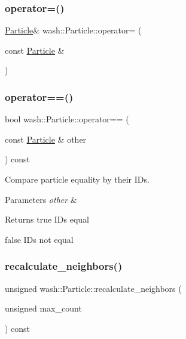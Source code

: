 \subsubsection{\texorpdfstring{operator=()}{operator=()}}
{\footnotesize\ttfamily \mbox{\hyperlink{classwash_1_1Particle}{Particle}}\& wash\+::\+Particle\+::operator= (\begin{DoxyParamCaption}\item[{const \mbox{\hyperlink{classwash_1_1Particle}{Particle}} \&}]{ }\end{DoxyParamCaption})\hspace{0.3cm}{\ttfamily [delete]}}

\mbox{\label{classwash_1_1Particle_a32369e6edba4277ebc71917a37c2503d}} 
\subsubsection{\texorpdfstring{operator==()}{operator==()}}
{\footnotesize\ttfamily bool wash\+::\+Particle\+::operator== (\begin{DoxyParamCaption}\item[{const \mbox{\hyperlink{classwash_1_1Particle}{Particle}} \&}]{other }\end{DoxyParamCaption}) const}



Compare particle equality by their I\+Ds. 


\begin{DoxyParams}{Parameters}
{\em other} & \\
\hline
\end{DoxyParams}
\begin{DoxyReturn}{Returns}
true ID\textquotesingle{}s equal 

false ID\textquotesingle{}s not equal 
\end{DoxyReturn}
\mbox{\label{classwash_1_1Particle_a570fc3286ab83d081950a5fb3d548d92}} 
\subsubsection{\texorpdfstring{recalculate\+\_\+neighbors()}{recalculate\_neighbors()}}
{\footnotesize\ttfamily unsigned wash\+::\+Particle\+::recalculate\+\_\+neighbors (\begin{DoxyParamCaption}\item[{unsigned}]{max\+\_\+count }\end{DoxyParamCaption}) const}

